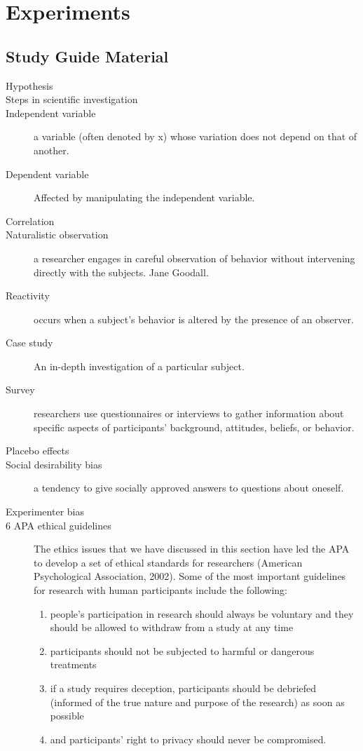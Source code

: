 \documentclass{article}
\begin{document}
\section{Experiments}

\subsection{Study Guide Material}
\begin{description}
    \item [Hypothesis]
    \item [Steps in scientific investigation]
    \item [Independent variable] a variable (often denoted by x) whose variation does not depend on that of another.
    \item [Dependent variable] Affected by manipulating the independent variable.
    \item [Correlation]
    \item [Naturalistic observation] a researcher engages in careful observation of behavior without intervening directly with the subjects. Jane Goodall.
    \item [Reactivity] occurs when a subject’s behavior is altered by the presence of an observer.
    \item [Case study] An in-depth investigation of a particular subject.
    \item [Survey] researchers use questionnaires or interviews to gather information about specific aspects of participants’ background, attitudes, beliefs, or behavior.
    \item [Placebo effects]
    \item [Social desirability bias] a tendency to give socially approved answers to questions about oneself.
    \item [Experimenter bias]
    \item [6 APA ethical guidelines] The ethics issues that we have discussed in this section have led the APA to develop a set of ethical standards for researchers (American Psychological Association, 2002). Some of the most important guidelines for research with human participants include the following:
    \begin{enumerate}
        \item  people's participation in research should always be voluntary and they should be allowed to withdraw from a study at any time
        \item  participants should not be subjected to harmful or dangerous treatments
        \item if a study requires deception, participants should be debriefed (informed of the true nature and purpose of the research) as soon as possible
        \item and participants’ right to privacy should never be compromised.
    \end{enumerate}


\end{description}
\end{document}
